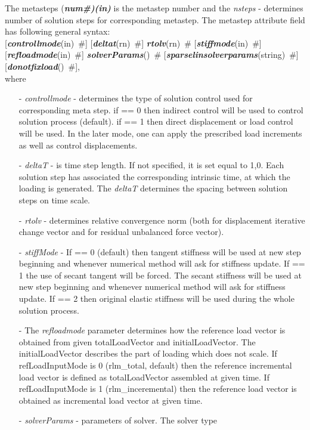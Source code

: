 \documentclass[draft]{article}
\newcommand{\param}[1]{{\em #1}}
\newcommand{\fieldVal}[2]{\mbox{({\it\bf{#1}\#)\tiny (#2)}}}
\newcommand{\keywordnotype}[1]{\mbox{{\it{\bf{#1}}}}}
\newcommand{\keyword}[2]{\mbox{{\keywordnotype{#1}\tiny (#2)}}}
\newcommand{\field}[2]{\mbox{\keyword{#1}{#2}~\#}}
\newcommand{\optField}[2]{\mbox{[\field{#1}{#2}]}}
\begin{document}
The metasteps \fieldVal{num}{in} is the metastep number and the
\param{nsteps} - determines number of solution steps for corresponding
metastep.
The metastep attribute field has following general syntax:\\
\optField{controllmode}{in} \optField{deltat}{rn}
\field{rtolv}{rn} \optField{stiffmode}{in}\\
\optField{refloadmode}{in} \field{solverParams}{}
\optField{sparselinsolverparams}{string}\\ \optField{donotfixload}{},\\
where 
\begin{itemize}
\item[-] \param{controllmode} - determines the type of solution
control used for corresponding meta step. if == 0 then indirect
control will be used to control solution process (default). if == 1
then direct displacement or load control will be used. In the later
mode, one can apply the prescribed load increments as well as
control displacements.
\item[-] \param{deltaT} - is time step length. If not specified, it is
set equal to 1,0. Each solution step has associated the corresponding
intrinsic time, at which the loading is generated. The \param{deltaT}
determines the spacing between solution steps on time scale. 
\item[-] \param{rtolv} - determines relative convergence norm (both for displacement
iterative change vector and for residual unbalanced force vector).
\item[-] \param{stiffMode} - If == 0 (default) then tangent stiffness will be used
at new step beginning and whenever numerical method will ask for
stiffness update. If == 1 the use of secant tangent will be forced. 
The secant stiffness will be used at new step beginning 
and whenever numerical method will ask for stiffness update.
If == 2 then original elastic stiffness will
be used during the whole solution process.
\item[-] The \param{refloadmode} parameter determines how the reference load vector 
is obtained from given totalLoadVector and initialLoadVector.
The initialLoadVector describes the part of loading which does not scale.
If refLoadInputMode is 0 (rlm\_total, default) then the reference incremental load vector is defined as
totalLoadVector assembled at given time.
If refLoadInputMode is 1 (rlm\_inceremental) then the reference load vector is
obtained as incremental load vector at given time.
\item[-] \param{solverParams} - parameters of solver. The solver type

\end{itemize}
\end{document}
